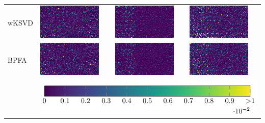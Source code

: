 \begin{tabular}{m{2cm}*{3}{M{0.24\textwidth}}}
    wKSVD&
    \includegraphics[width=\tmplength]{img/chapitre4/figure7/R2_wKSVD_band_0.png}&
    \includegraphics[width=\tmplength]{img/chapitre4/figure7/R2_wKSVD_band_1.png}&
    \includegraphics[width=\tmplength]{img/chapitre4/figure7/R2_wKSVD_band_2.png}\\
    BPFA&
    \includegraphics[width=\tmplength]{img/chapitre4/figure7/R2_BPFA_band_0.png}&
    \includegraphics[width=\tmplength]{img/chapitre4/figure7/R2_BPFA_band_1.png}&
    \includegraphics[width=\tmplength]{img/chapitre4/figure7/R2_BPFA_band_2.png}\\
    &\\
\end{tabular}